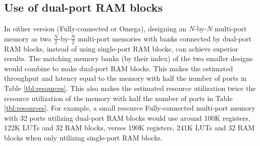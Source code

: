\subsection{Use of dual-port RAM blocks}
\label{sec:dualportbank}

In either version (Fully-connected or Omega), designing an $N$-by-$N$ multi-port memory as two $\frac{N}{2}$-by-$\frac{N}{2}$ multi-port memories with banks connected by dual-port RAM blocks, instead of using single-port RAM blocks, can achieve superior results. The matching memory banks (by their index) of the two smaller designs would combine to make dual-port RAM blocks. This makes the estimated throughput and latency equal to the memory with half the number of ports in Table \ref{tbl:resources}. This also makes the estimated resource utilization twice the resource utilization of the memory with half the number of ports in Table \ref{tbl:resources}.
For example, a small resource Fully-connected multi-port memory with 32 ports utilizing dual-port RAM blocks would use around 100K registers, 122K LUTs and 32 RAM blocks, verses 190K registers, 241K LUTs and 32 RAM blocks when only utilizing single-port RAM blocks.

